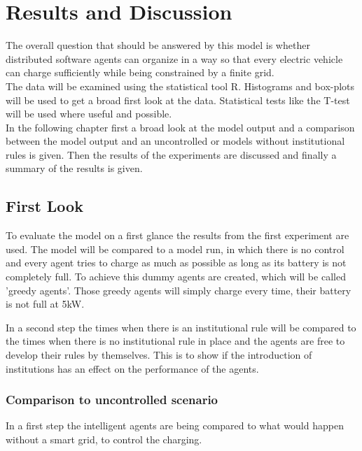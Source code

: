 \documentclass[a4paper]{article}
\begin{document}
\clearpage
\section{Results and Discussion}
The overall question that should be answered by this model is whether distributed software agents can organize in a way so that 
every electric vehicle can charge sufficiently while being constrained by a finite grid. \\
The data will be examined using the statistical tool R. Histograms and box-plots will be used to get a broad first look at the data. 
Statistical tests like the T-test will be used where useful and possible.\\
In the following chapter first a broad look at the model output and a comparison between the model output and an uncontrolled or 
models without institutional rules is given. Then the results of the experiments are discussed and finally a summary of the results is 
given.
\subsection{First Look}
To evaluate the model on a first glance the results from the first experiment are used. The 
model will be compared to a model run, in which there is no control and every agent tries to charge as much as possible as long as 
its battery is not completely full. To achieve this dummy agents are created, which will be called 'greedy agents'. Those greedy 
agents will simply charge every time, their battery is not full at 5kW.

In a second step the times when there is an institutional rule will be compared to the times when there is no institutional 
rule in place and the agents are free to develop their rules by themselves. This is to show if the introduction of institutions has an 
effect on the performance of the agents. 
\subsubsection{Comparison to uncontrolled scenario}
In a first step the intelligent agents are being compared to what would happen without a smart grid, to control the charging. 
\end{document}
